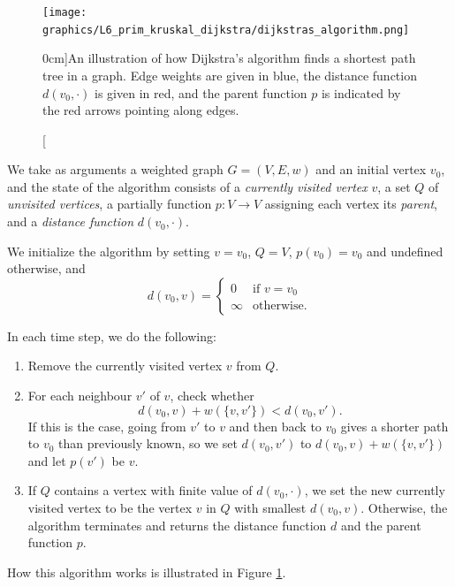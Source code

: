 \documentclass[nobib]{tufte-handout}
\begin{document}
\begin{figure}
  \centering
  \texttt{[image: graphics/L6\_prim\_kruskal\_dijkstra/dijkstras\_algorithm.png]}
  \caption[][0cm]{An illustration of how Dijkstra's algorithm finds a shortest path tree in a graph. Edge weights are given in blue, the distance function $d(v_0, \cdot)$ is given in red, and the parent function $p$ is indicated by the red arrows pointing along edges.}
  \label{fig:dijkstras_algorithm}
\end{figure}

\begin{definition}
  We take as arguments a weighted graph $G = (V,E,w)$ and an initial vertex $v_0$, and the state of the algorithm consists of a \emph{currently visited vertex} $v$, a set $Q$ of \emph{unvisited vertices}, a partially function $p: V \to V$ assigning each vertex its \emph{parent}, and a \emph{distance function} $d(v_0, \cdot)$. 
  
  We initialize the algorithm by setting $v = v_0$, $Q = V$, $p(v_0) = v_0$ and undefined otherwise, and
  $$d(v_0, v) = \begin{cases}
    0&\text{if }v=v_0\\
    \infty&\text{otherwise.}
  \end{cases}$$

  In each time step, we do the following:
  \begin{enumerate}
    \item Remove the currently visited vertex $v$ from $Q$.
    \item For each neighbour $v'$ of $v$, check whether
          $$d(v_0, v) + w(\{v, v'\}) < d(v_0, v').$$
          If this is the case, going from $v'$ to $v$ and then back to $v_0$ gives a shorter path to $v_0$ than previously known, so we set $d(v_0, v')$ to $d(v_0, v) + w(\{v, v'\})$ and let $p(v')$ be $v$.
    \item If $Q$ contains a vertex with finite value of $d(v_0, \cdot)$, we set the new currently visited vertex to be the vertex $v$ in $Q$ with smallest $d(v_0,v)$. Otherwise, the algorithm terminates and returns the distance function $d$ and the parent function $p$.
  \end{enumerate}

  How this algorithm works is illustrated in Figure \ref{fig:dijkstras_algorithm}.
\end{definition}
\end{document}
